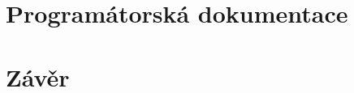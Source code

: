 \documentclass{article}
\begin{document}
	\section{Programátorská dokumentace}
	
	\section{Závěr} %
	
	
\end{document}
